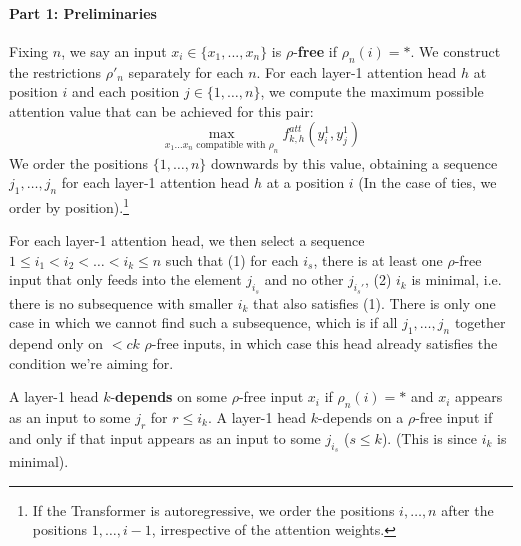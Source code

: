 \documentclass[11pt,a4paper]{article}
\newcommand{\key}[1]{\textbf{#1}}
\begin{document}
\paragraph{Part 1: Preliminaries}


Fixing $n$, we say an input $x_i \in \{x_1, ..., x_n\}$ is $\rho$-\key{free} if $\rho_n(i) = *$.
We construct the restrictions $\rho'_n$ separately for each $n$.
For each layer-1 attention head $h$ at position $i$ and each position $j \in \{1, \dots, n\}$, we compute the maximum possible attention value that can be achieved for this pair:
\begin{equation}
\max_{x_1\dots x_n \text{ compatible with } \rho_n} f^{att}_{k,h}(y_i^{1}, y^{1}_j)
\end{equation}
We order the positions $\{1, \dots, n\}$ downwards by this value, obtaining a sequence $j_1, \dots, j_n$ for each layer-1 attention head $h$ at a position $i$ (In the case of ties, we order by  position).\footnote{If the Transformer is autoregressive, we order the positions $i, \dots, n$ after the positions $1, \dots, i-1$, irrespective of the attention weights.}

For each layer-1 attention head, we then select a sequence $1 \leq i_1 < i_2 < \dots < i_k \leq n$ such that (1) for each $i_s$, there is at least one $\rho$-free input that only feeds into the element $j_{i_s}$ and no other $j_{i_s'}$, (2) $i_k$ is minimal, i.e. there is no subsequence with smaller $i_k$ that also satisfies (1).
There is only one case in which we cannot find such a subsequence, which is if all $j_1, \dots, j_n$ together depend only on $< ck$ $\rho$-free inputs, in which case this head already satisfies the condition we're aiming for.

A layer-1 head $k$-\textbf{depends} on some $\rho$-free input $x_i$ if $\rho_n(i) = *$ and $x_i$ appears as an input to some $j_r$ for $r \leq i_k$.
A layer-1 head $k$-depends on a $\rho$-free input if and only if that input appears as an input to some $j_{i_s}$ ($s \leq k$). (This is since $i_k$ is minimal).
\end{document}

